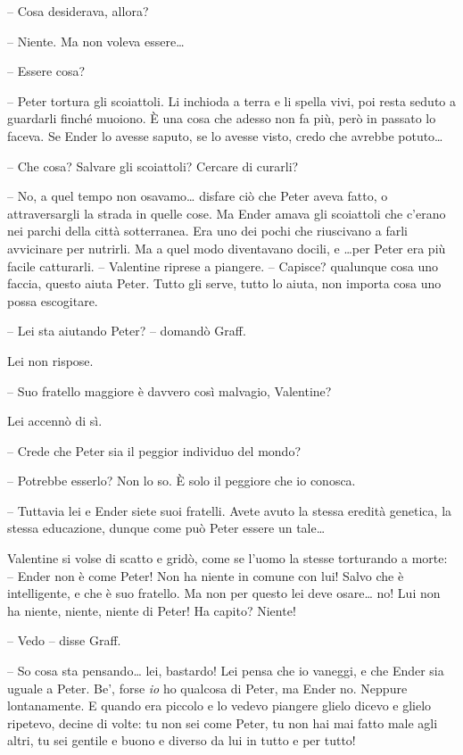 {-- Cosa desiderava, allora?}

{-- Niente. Ma non voleva essere\ldots{}}

{-- Essere cosa?}

{-- Peter tortura gli scoiattoli. Li inchioda a terra e li spella vivi,
	poi resta seduto a guardarli finché muoiono. È una cosa che adesso non
	fa più, però in passato lo faceva. Se Ender lo avesse saputo, se lo
	avesse visto, credo che avrebbe potuto\ldots{}}

{-- Che cosa? Salvare gli scoiattoli? Cercare di curarli?}

{-- No, a quel tempo non osavamo\ldots{} disfare ciò che Peter aveva
	fatto, o attraversargli la strada in quelle cose. Ma Ender amava gli
	scoiattoli che c'erano nei parchi della città sotterranea. Era uno dei
	pochi che riuscivano a farli avvicinare per nutrirli. Ma a quel modo
	diventavano docili, e \ldots per Peter era più facile catturarli. --
	Valentine riprese a piangere. -- Capisce? qualunque cosa uno faccia,
	questo aiuta Peter. Tutto gli serve, tutto lo aiuta, non importa cosa
	uno possa escogitare.}

{-- Lei sta aiutando Peter? -- domandò Graff.}

{Lei non rispose.}

{-- Suo fratello maggiore è davvero così malvagio, Valentine?}

{Lei accennò di sì.}

{-- Crede che Peter sia il peggior individuo del mondo?}

{-- Potrebbe esserlo? Non lo so. È solo il peggiore che io conosca.}

{-- Tuttavia lei e Ender siete suoi fratelli. Avete avuto la stessa
	eredità genetica, la stessa educazione, dunque come può Peter essere un
	tale\ldots{}}

{Valentine si volse di scatto e gridò, come se l'uomo la stesse
	torturando a morte: -- Ender non è come Peter! Non ha niente in comune
	con lui! Salvo che è intelligente, e che è suo fratello. Ma non per
	questo lei deve osare\ldots{} no! Lui non ha niente, niente, niente di
	Peter! Ha capito? Niente!}

{-- Vedo -- disse Graff.}

{-- So cosa sta pensando\ldots{} lei, bastardo! Lei pensa che io
	vaneggi, e che Ender sia uguale a Peter. Be', forse \emph{io} ho
	qualcosa di Peter, ma Ender no. Neppure lontanamente. E quando era
	piccolo e lo vedevo piangere glielo dicevo e glielo ripetevo, decine di
	volte: tu non sei come Peter, tu non hai mai fatto male agli altri, tu
	sei gentile e buono e diverso da lui in tutto e per tutto!}

